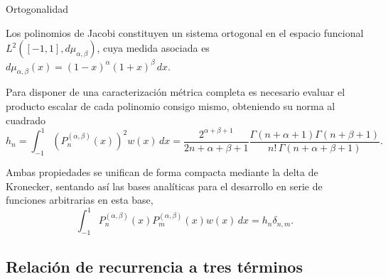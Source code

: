 \documentclass[xcolor=dvipsnames,10pt]{beamer}
\begin{document}
\begin{frame}{Ortogonalidad}

    Los polinomios de Jacobi constituyen un sistema ortogonal en el espacio funcional $L^2([-1,1], d\mu_{\alpha, \beta})$, cuya medida asociada es $d\mu_{\alpha, \beta}(x) = (1-x)^\alpha (1+x)^\beta \, dx$. 

    \vspace{0.1cm}

    \begin{overprint}
    \vspace{0.1cm}
    Para disponer de una caracterización métrica completa es necesario evaluar el producto escalar de cada polinomio consigo mismo, obteniendo su norma al cuadrado
    \vspace{-0.1cm}
    \[
    h_n = \int_{-1}^{1} (P_n^{(\alpha, \beta)}(x))^2 w(x) \, dx = \frac{2^{\alpha+\beta+1}}{2n+\alpha+\beta+1} \frac{\Gamma(n+\alpha+1)\Gamma(n+\beta+1)}{n! \,\Gamma(n+\alpha+\beta+1)}.
    \]
    
    Ambas propiedades se unifican de forma compacta mediante la delta de Kronecker, sentando así las bases analíticas para el desarrollo en serie de funciones arbitrarias en esta base,
    \vspace{-0.1cm}
    \[
    \int_{-1}^{1} P_n^{(\alpha, \beta)}(x) P_m^{(\alpha, \beta)}(x) w(x) \, dx = h_n \delta_{n,m}.
    \]  
    \end{overprint}
\end{frame}

\subsection{Relación de recurrencia a tres términos}
\end{document}
